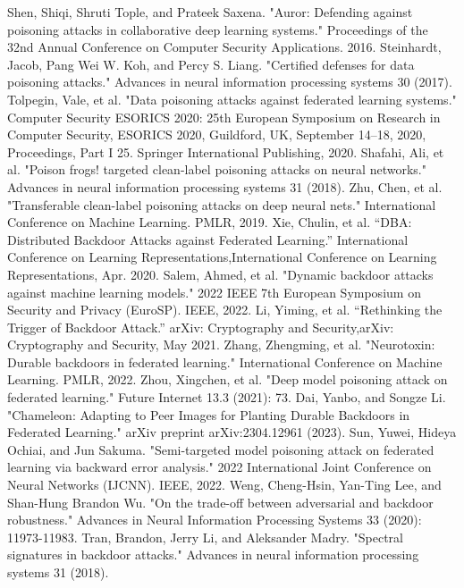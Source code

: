 \documentclass[conference]{IEEEtran}
\begin{document}
\begin{thebibliography}{00}
     Shen, Shiqi, Shruti Tople, and Prateek Saxena. "Auror: Defending against poisoning attacks in collaborative deep learning systems." Proceedings of the 32nd Annual Conference on Computer Security Applications. 2016.
     Steinhardt, Jacob, Pang Wei W. Koh, and Percy S. Liang. "Certified defenses for data poisoning attacks." Advances in neural information processing systems 30 (2017).
     Tolpegin, Vale, et al. "Data poisoning attacks against federated learning systems." Computer Security ESORICS 2020: 25th European Symposium on Research in Computer Security, ESORICS 2020, Guildford, UK, September 14–18, 2020, Proceedings, Part I 25. Springer International Publishing, 2020.
     Shafahi, Ali, et al. "Poison frogs! targeted clean-label poisoning attacks on neural networks." Advances in neural information processing systems 31 (2018).
     Zhu, Chen, et al. "Transferable clean-label poisoning attacks on deep neural nets." International Conference on Machine Learning. PMLR, 2019.
     Xie, Chulin, et al. “DBA: Distributed Backdoor Attacks against Federated Learning.” International Conference on Learning Representations,International Conference on Learning Representations, Apr. 2020.
     Salem, Ahmed, et al. "Dynamic backdoor attacks against machine learning models." 2022 IEEE 7th European Symposium on Security and Privacy (EuroSP). IEEE, 2022.
     Li, Yiming, et al. “Rethinking the Trigger of Backdoor Attack.” arXiv: Cryptography and Security,arXiv: Cryptography and Security, May 2021.
     Zhang, Zhengming, et al. "Neurotoxin: Durable backdoors in federated learning." International Conference on Machine Learning. PMLR, 2022.
     Zhou, Xingchen, et al. "Deep model poisoning attack on federated learning." Future Internet 13.3 (2021): 73.
     Dai, Yanbo, and Songze Li. "Chameleon: Adapting to Peer Images for Planting Durable Backdoors in Federated Learning." arXiv preprint arXiv:2304.12961 (2023).
     Sun, Yuwei, Hideya Ochiai, and Jun Sakuma. "Semi-targeted model poisoning attack on federated learning via backward error analysis." 2022 International Joint Conference on Neural Networks (IJCNN). IEEE, 2022.
     Weng, Cheng-Hsin, Yan-Ting Lee, and Shan-Hung Brandon Wu. "On the trade-off between adversarial and backdoor robustness." Advances in Neural Information Processing Systems 33 (2020): 11973-11983.
     Tran, Brandon, Jerry Li, and Aleksander Madry. "Spectral signatures in backdoor attacks." Advances in neural information processing systems 31 (2018).

\end{thebibliography}
\end{document}
